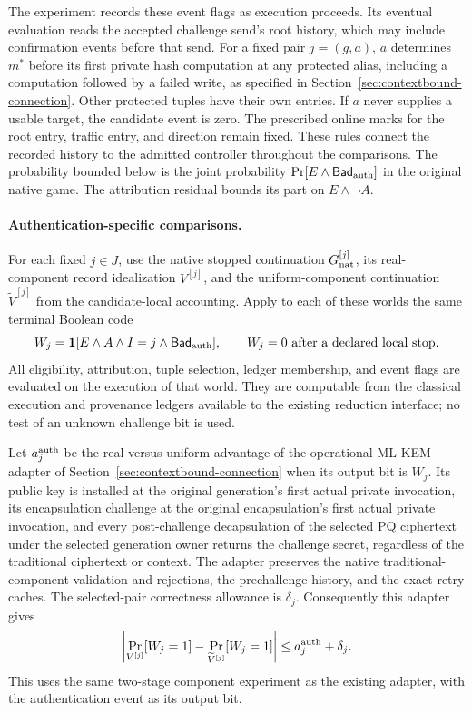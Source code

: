 \documentclass[pdflatex]{sn-jnl}
\theoremstyle{thmstyleone}
\theoremstyle{thmstylethree}
\theoremstyle{thmstyletwo}
\begin{document}
The experiment records these event flags as execution proceeds.  Its eventual
evaluation reads the accepted challenge send's root history, which may
include confirmation events before that send.  For a fixed pair $j=(g,a)$,
$a$ determines $m^*$ before its first private hash computation
at any protected alias, including a computation followed by a failed write,
as specified in Section~\ref{sec:contextbound-connection}.  Other protected
tuples have their own entries.  If $a$ never supplies a usable
target, the candidate event is zero.  The prescribed online marks for the
root entry, traffic entry, and direction remain fixed.  These rules connect the
recorded history to the admitted controller throughout the comparisons.
The probability bounded below is the joint probability
$\Pr[E\wedge\mathsf{Bad}_{\rm auth}]$ in the original native game.  The
attribution residual bounds its part on $E\wedge\neg A$.

\paragraph{Authentication-specific comparisons.}
For each fixed $j\in J$, use the native stopped continuation
$G_{\rm nat}^{[j]}$, its real-component record idealization $V^{[j]}$, and the
uniform-component continuation $\widetilde V^{[j]}$ from the candidate-local
accounting.  Apply to each of these worlds the same terminal Boolean code
\[
 W_j=\mathbf1[
 E\wedge A\wedge I=j\wedge\mathsf{Bad}_{\rm auth}],
 \qquad W_j=0\text{ after a declared local stop}.
\]
All eligibility, attribution, tuple selection, ledger membership, and event
flags are evaluated on the execution of that world.  They are computable from
the classical execution and provenance ledgers available to the existing
reduction interface; no test of an unknown challenge bit is used.

Let $a_j^{\rm auth}$ be the real-versus-uniform advantage of the operational
ML-KEM adapter of Section~\ref{sec:contextbound-connection} when its output
bit is $W_j$.  Its public key is installed at the original generation's
first actual private invocation, its encapsulation challenge at the original
encapsulation's first actual private invocation, and every post-challenge decapsulation of
the selected PQ ciphertext under the selected generation owner returns the
challenge secret, regardless of the traditional ciphertext or context.
The adapter preserves the native traditional-component validation and
rejections, the prechallenge history, and the exact-retry caches.
The selected-pair correctness allowance is
$\delta_j$.  Consequently this adapter gives
\begin{equation}
 \left|\Pr_{V^{[j]}}[W_j=1]
       -\Pr_{\widetilde V^{[j]}}[W_j=1]\right|
 \le a_j^{\rm auth}+\delta_j.
 \label{eq:native-auth-component}
\end{equation}
This uses the same two-stage component experiment as the existing adapter,
with the authentication event as its output bit.
\end{document}

